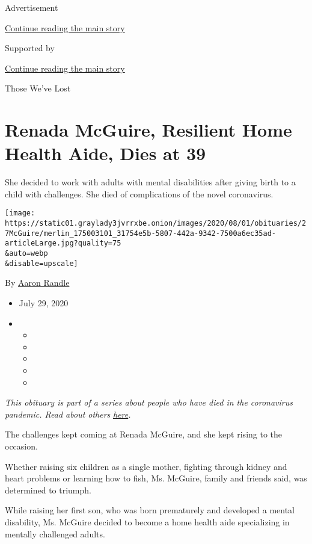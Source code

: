 Advertisement

\protect\hyperlink{after-top}{Continue reading the main story}

Supported by

\protect\hyperlink{after-sponsor}{Continue reading the main story}

Those We've Lost

\hypertarget{renada-mcguire-resilient-home-health-aide-dies-at-39}{%
\section{Renada McGuire, Resilient Home Health Aide, Dies at
39}\label{renada-mcguire-resilient-home-health-aide-dies-at-39}}

She decided to work with adults with mental disabilities after giving
birth to a child with challenges. She died of complications of the novel
coronavirus.

\texttt{[image: https://static01.graylady3jvrrxbe.onion/images/2020/08/01/obituaries/27McGuire/merlin\_175003101\_31754e5b-5807-442a-9342-7500a6ec35ad-articleLarge.jpg?quality=75\\\&auto=webp\\\&disable=upscale]}

By \href{https://www.nytimes3xbfgragh.onion/by/aaron-randle}{Aaron
Randle}

\begin{itemize}
\item
  July 29, 2020
\item
  \begin{itemize}
  \item
  \item
  \item
  \item
  \item
  \end{itemize}
\end{itemize}

\emph{This obituary is part of a series about people who have died in
the coronavirus pandemic. Read about others}
\href{https://www.nytimes3xbfgragh.onion/interactive/2020/obituaries/people-died-coronavirus-obituaries.html}{\emph{here}}\emph{.}

The challenges kept coming at Renada McGuire, and she kept rising to the
occasion.

Whether raising six children as a single mother, fighting through kidney
and heart problems or learning how to fish, Ms. McGuire, family and
friends said, was determined to triumph.

While raising her first son, who was born prematurely and developed a
mental disability, Ms. McGuire decided to become a home health aide
specializing in mentally challenged adults.

